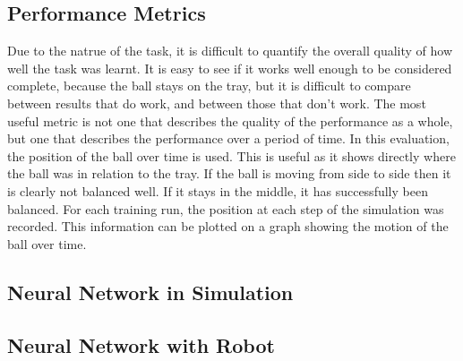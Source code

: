 \documentclass[12pt,a4paper]{article}
\begin{document}
\subsection{Performance Metrics}
Due to the natrue of the task, it is difficult to quantify the overall quality of how well the task was learnt. It is easy to see if it works well enough to be considered complete, because the ball stays on the tray, but it is difficult to compare between results that do work, and between those that don't work. The most useful metric is not one that describes the quality of the performance as a whole, but one that describes the performance over a period of time. In this evaluation, the position of the ball over time is used. This is useful as it shows directly where the ball was in relation to the tray. If the ball is moving from side to side then it is clearly not balanced well. If it stays in the middle, it has successfully been balanced. For each training run, the position at each step of the simulation was recorded. This information can be plotted on a graph showing the motion of the ball over time. 
\subsection{Neural Network in Simulation}
\subsection{Neural Network with Robot}
\end{document}
